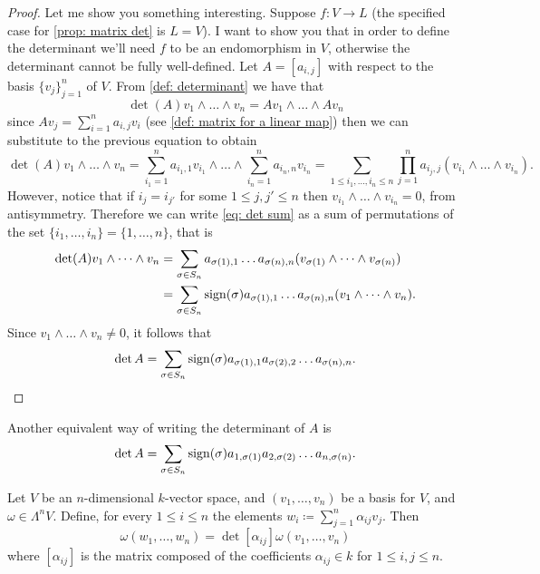 \begin{proof}
    Let me show you something interesting. Suppose \(f: V \to L\) (the specified
    case for \cref{prop: matrix det} is \(L = V\)). I want to show you that in
    order to define the determinant we'll need \(f\) to be an endomorphism in
    \(V\), otherwise the determinant cannot be fully well-defined. Let \(A =
    [a_{i, j}]\) with respect to the basis \(\{v_j\}_{j=1}^n\) of \(V\). From
    \cref{def: determinant} we have that
    \[
        \det(A) v_1 \wedge \dots \wedge v_n = A v_1 \wedge \dots \wedge A v_n
    \]
    since \(A v_j = \sum_{i = 1}^n a_{i, j} v_i\) (see \cref{def: matrix for a
        linear map}) then we can substitute to the previous equation to obtain
    \begin{equation}\label{eq: det sum}
        \det(A) v_1 \wedge \dots \wedge v_n
        = \sum_{i_1 = 1}^n a_{i_1, 1} v_{i_1} \wedge \dots \wedge \sum_{i_n = 1}^n
        a_{i_n, n} v_{i_n}
        = \sum_{1 \leq i_1, \dots, i_n \leq n} \prod_{j=1}^n a_{i_j, j} (v_{i_1}
        \wedge \dots \wedge v_{i_n}).
    \end{equation}
    However, notice that if \(i_j = i_{j'}\) for some \(1 \leq j, j' \leq n\) then
    \(v_{i_1} \wedge \dots \wedge v_{i_n} = 0\), from antisymmetry.
    Therefore we can write \cref{eq: det sum} as a sum of permutations of the set
    \(\{i_1, \dots, i_n\} = \{1, \dots, n\}\), that is
    \begin{align*}
        \det(A) v_1 \wedge \dots \wedge v_n
         & = \sum_{\sigma \in S_n} a_{\sigma(1), 1} \dots a_{\sigma(n), n}
        (v_{\sigma(1)} \wedge \dots \wedge v_{\sigma(n)})                  \\
         & = \sum_{\sigma \in S_n} \operatorname{sign}(\sigma) a_{\sigma(1), 1} \dots
        a_{\sigma(n), n} (v_1 \wedge \dots \wedge v_n).
    \end{align*}
    Since \(v_1 \wedge \dots \wedge v_n \neq 0\), it follows that
    \[
        \det A = \sum_{\sigma \in S_n} \operatorname{sign}(\sigma) a_{\sigma(1), 1}
        a_{\sigma(2), 2} \dots a_{\sigma(n), n}.
    \]
\end{proof}

\begin{corollary}
    Another equivalent way of writing the determinant of \(A\) is
    \[
        \det A = \sum_{\sigma \in S_n} \operatorname{sign}(\sigma) a_{1, \sigma(1)} a_{2,
                \sigma(2)} \dots a_{n, \sigma(n)}.
    \]
\end{corollary}

\begin{proposition}
    \label{prop:form-change-basis-det}
    Let \(V\) be an \(n\)-dimensional \(k\)-vector space, and \((v_1, \dots,
    v_n)\) be a basis for \(V\), and \(\omega \in \Lambda^n V\). Define, for every
    \(1 \leq i \leq n\) the elements \(w_i \coloneq \sum_{j=1}^n \alpha_{i j}
    v_j\). Then
    \[
        \omega(w_1, \dots, w_n) = \det[\alpha_{i j}] \omega(v_1, \dots, v_n)
    \]
    where \([\alpha_{i j}]\) is the matrix composed of the coefficients
    \(\alpha_{ij} \in k\) for \(1 \leq i, j \leq n\).
\end{proposition}

